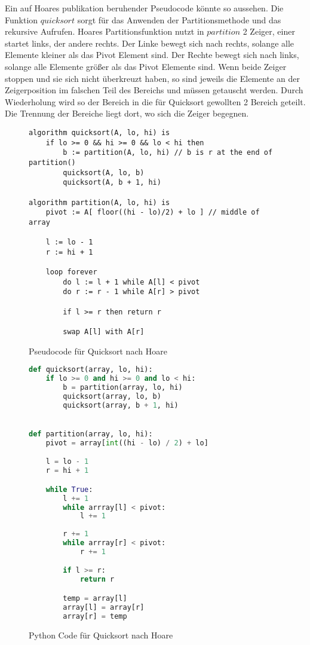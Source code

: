 Ein auf Hoares publikation beruhender Pseudocode könnte so aussehen.
Die Funktion $quicksort$ sorgt für das Anwenden der Partitionsmethode und das rekursive
Aufrufen. Hoares Partitionsfunktion nutzt in $partition$ 2 Zeiger, einer startet links,
der andere rechts. Der Linke bewegt sich nach rechts, solange alle Elemente kleiner
als das Pivot Element sind. Der Rechte bewegt sich nach links, solange alle Elemente
größer als das Pivot Elemente sind. Wenn beide Zeiger stoppen und sie sich nicht überkreuzt
haben, so sind jeweils die Elemente an der Zeigerposition im falschen Teil des Bereichs und
müssen getauscht werden. Durch Wiederholung wird so der Bereich in die für Quicksort gewollten
2 Bereich geteilt. Die Trennung der Bereiche liegt dort, wo sich die Zeiger begegnen.

\begin{figure}[H]
\begin{lstlisting}
algorithm quicksort(A, lo, hi) is 
    if lo >= 0 && hi >= 0 && lo < hi then
        b := partition(A, lo, hi) // b is r at the end of partition()
        quicksort(A, lo, b)
        quicksort(A, b + 1, hi) 

algorithm partition(A, lo, hi) is 
    pivot := A[ floor((hi - lo)/2) + lo ] // middle of array

    l := lo - 1
    r := hi + 1

    loop forever 
        do l := l + 1 while A[l] < pivot
        do r := r - 1 while A[r] > pivot

        if l >= r then return r

        swap A[l] with A[r]
\end{lstlisting}
\caption{Pseudocode für Quicksort nach Hoare}
\end{figure}

\begin{figure}[H]
\begin{lstlisting}[language=python]
def quicksort(array, lo, hi):
    if lo >= 0 and hi >= 0 and lo < hi:
        b = partition(array, lo, hi)
        quicksort(array, lo, b)
        quicksort(array, b + 1, hi)


def partition(array, lo, hi):
    pivot = array[int((hi - lo) / 2) + lo]

    l = lo - 1
    r = hi + 1

    while True:
        l += 1
        while arrray[l] < pivot:
            l += 1
        
        r += 1
        while arrray[r] < pivot:
            r += 1

        if l >= r:
            return r

        temp = array[l]
        array[l] = array[r]
        array[r] = temp
\end{lstlisting}
\caption{Python Code für Quicksort nach Hoare}
\end{figure}

